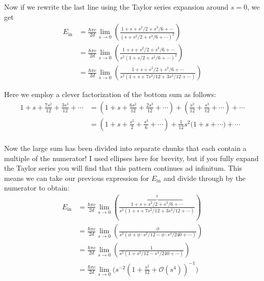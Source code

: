 Now if we rewrite the last line using the Taylor series expansion around $s=0$, we get
\begin{align*}
E_{\text{in}} &= \frac{\hbar \pi c}{2d} \lim\limits_{s \rightarrow 0} \left( \frac{1 + s + s^2/2 + s^3/6 + \cdots}{(s + s^2/2 + s^3/6 + \cdots)^2} \right) \\
&= \frac{\hbar \pi c}{2d} \lim\limits_{s \rightarrow 0} \left( \frac{1 + s + s^2/2 + s^3/6 + \cdots}{s^2 (1 + s/2 + s^2/6 + \cdots)^2} \right) \\
&= \frac{\hbar \pi c}{2d} \lim\limits_{s \rightarrow 0} \left( \frac{1 + s + s^2/2 + s^3/6 + \cdots}{s^2 (1 + s + 7s^2/12 + 3s^3/12 + \cdots )} \right) 
\end{align*}

Here we employ a clever factorization of the bottom sum as follows:
\begin{align*}
	1 + s + \frac{7s^2}{12} + \frac{3s^3}{12} + \cdots &= \left( 1 + s + \frac{6s^2}{12} + \frac{2s^3}{12} + \cdots \right) + \left( \frac{s^2}{12} + \frac{s^3}{12} + \cdots \right) + \cdots \\
	&= \left( 1 + s + \frac{s^2}{2} + \frac{s^3}{6} + \cdots \right) + \frac{1}{12}s^2 \bigg( 1 + s + \cdots \bigg) + \cdots \\
\end{align*}

Now the large sum has been divided into separate chunks that each contain a multiple of the numerator! I used ellipses here for brevity, but if you fully expand the Taylor series you will find that this pattern continues ad infinitum. This means we can take our previous expression for $E_{\text{in}}$ and divide through by the numerator to obtain:
\begin{align*}
	E_{\text{in}} &= \frac{\hbar \pi c}{2d} \lim\limits_{s \rightarrow 0} \left( \frac{\overbrace{1 + s + s^2/2 + s^3/6 + \cdots}^{\phi}}{s^2 (1 + s + 7s^2/12 + 3s^3/12 + \cdots )} \right) \\
	&= \frac{\hbar \pi c}{2d} \lim\limits_{s \rightarrow 0} \left( \frac{\phi}{s^2 (\phi + \phi \cdot s^2/12 - \phi \cdot s^4/240 + \cdots)} \right) \\
	&= \frac{\hbar \pi c}{2d} \lim\limits_{s \rightarrow 0} \left( \frac{1}{s^2 \left(1 + s^2/12 - s^4/240 + \cdots \right)} \right) \\
	&= \frac{\hbar \pi c}{2d} \lim\limits_{s \rightarrow 0} \bigg( s^{-2} \left(1 + \frac{s^2}{12} + \mathcal{O}(s^4) \right)^{-1}  \bigg)
\end{align*}


